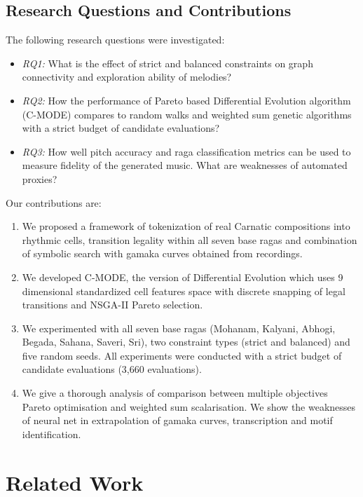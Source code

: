 \documentclass[conference,letterpaper]{IEEEtran}
\newcommand{\cmode}{C-MODE}
\newcounter{algorithm}
\begin{document}
\subsection{Research Questions and Contributions}
The following research questions were investigated:
\begin{itemize}
    \item \textit{RQ1:} What is the effect of strict and balanced constraints on graph connectivity and exploration ability of melodies?
    \item \textit{RQ2:} How the performance of Pareto based Differential Evolution algorithm (\cmode) compares to random walks and weighted sum genetic algorithms with a strict budget of candidate evaluations?
    \item \textit{RQ3:} How well pitch accuracy and raga classification metrics can be used to measure fidelity of the generated music. What are weaknesses of automated proxies?
\end{itemize}

Our contributions are:
\begin{enumerate}
    \item We proposed a framework of tokenization of real Carnatic compositions into rhythmic cells, transition legality within all seven base ragas and combination of symbolic search with gamaka curves obtained from recordings.
    \item We developed \cmode, the version of Differential Evolution which uses 9 dimensional standardized cell features space with discrete snapping of legal transitions and NSGA-II Pareto selection.
    \item We experimented with all seven base ragas (Mohanam, Kalyani, Abhogi, Begada, Sahana, Saveri, Sri), two constraint types (strict and balanced) and five random seeds. All experiments were conducted with a strict budget of candidate evaluations (3,660 evaluations).
    \item We give a thorough analysis of comparison between multiple objectives Pareto optimisation and weighted sum scalarisation. We show the weaknesses of neural net in extrapolation of gamaka curves, transcription and motif identification.
\end{enumerate}

\section{Related Work}
\end{document}
